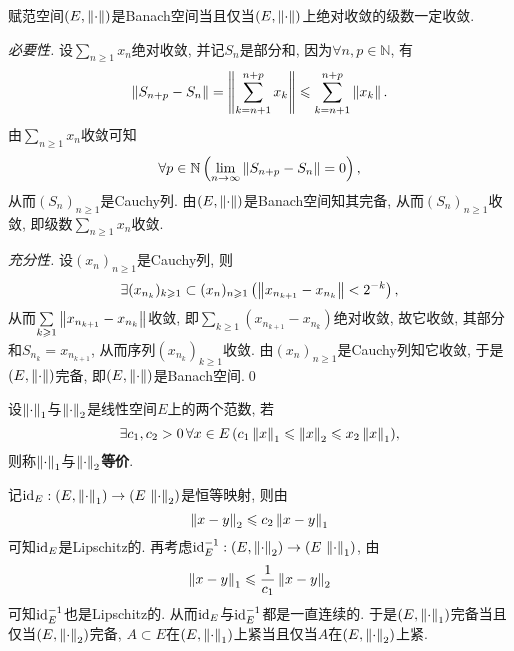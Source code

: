 	\begin{Theorem}
	赋范空间$ (E,\left\| \cdot \right\|) $是Banach空间当且仅当$ (E,\left\| \cdot \right\|) $上绝对收敛的级数一定收敛.
	\end{Theorem}
	\begin{Proof}
	\textsl{必要性.} 设$ \sum\limits_{n\geqslant 1}x_n $绝对收敛, 并记$ S_n $是部分和, 因为$ \forall n,p\in\mathbb{N} $, 有
	\[
	\left\| S_{n+p}-S_n \right\|=\left\| \sum_{k=n+1}^{n+p}x_k \right\|\leqslant\sum_{k=n+1}^{n+p}\left\| x_k \right\|.
	\]
	由$ \sum\limits_{n\geqslant 1}x_n $收敛可知
	\[
	\forall p\in\mathbb{N}\left(\lim_{n\to\infty}\left\| S_{n+p}-S_n \right\|=0\right),
	\]
	从而$ (S_n)_{n\geqslant 1} $是Cauchy列. 由$ (E,\left\| \cdot \right\|) $是Banach空间知其完备, 从而$ (S_n)_{n\geqslant 1} $收敛, 即级数$ \sum\limits_{n\geqslant 1}x_n $收敛.
	
	\textsl{充分性.} 设$ (x_n)_{n\geqslant 1} $是Cauchy列, 则
	\[
	\exists(x_{n_k})_{k\geqslant 1}\subset(x_n)_{n\geqslant 1}\left(\left\| x_{n_{k+1}}-x_{n_k} \right\|<2^{-k}\right),
	\]
	从而$ \sum\limits_{k\geqslant 1}\left\| x_{n_{k+1}}-x_{n_k} \right\| $收敛, 即$ \sum\limits_{k\geqslant 1}(x_{n_{k+1}}-x_{n_k}) $绝对收敛, 故它收敛, 其部分和$ S_{n_k}=x_{n_{k+1}} $, 从而序列$ (x_{n_k})_{k\geqslant 1} $收敛. 由$ (x_n)_{n\geqslant 1} $是Cauchy列知它收敛, 于是$ (E,\left\| \cdot \right\|) $完备, 即$ (E,\left\| \cdot \right\|) $是Banach空间.\qed
	\end{Proof}
	
	\begin{Definition}[范数等价]
		设$ \left\| \cdot \right\|_1 $与$ \left\| \cdot \right\|_2 $是线性空间$ E $上的两个范数, 若
		\[
		\exists c_1,c_2>0\,\forall x\in E\,(c_1\left\| x \right\|_1\leqslant\left\| x \right\|_2\leqslant x_2\left\| x \right\|_1),
		\]
		则称$ \left\| \cdot \right\|_1 $与$ \left\| \cdot \right\|_2 $\textbf{等价}.
	\end{Definition}
	
	\begin{Remark}
	记$ \mathrm{id}_E : (E,\left\| \cdot \right\|_1)\to(E\,\left\| \cdot \right\|_2) $是恒等映射, 则由
	\[
	\left\| x-y \right\|_2\leqslant c_2\left\| x-y \right\|_1
	\]
	可知$ \mathrm{id}_E $是Lipschitz的. 再考虑$ \mathrm{id}_E^{-1} : (E,\left\| \cdot \right\|_2)\to(E\,\left\| \cdot \right\|_1) $, 由
	\[
	\left\| x-y \right\|_1\leqslant\frac{1}{c_1}\left\| x-y \right\|_2
	\]
	可知$ \mathrm{id}_E^{-1} $也是Lipschitz的. 从而$ \mathrm{id}_E $与$ \mathrm{id}_E^{-1} $都是一直连续的. 于是$ (E,\left\| \cdot \right\|_1) $完备当且仅当$ (E,\left\| \cdot \right\|_2) $完备, $ A\subset E $在$ (E,\left\| \cdot \right\|_1) $上紧当且仅当$ A $在$ (E,\left\| \cdot \right\|_2) $上紧.
	\end{Remark}
	
